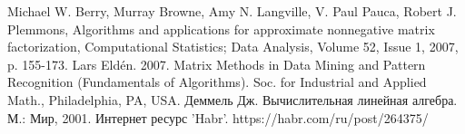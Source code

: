 \newpage
{}

\begin{thebibliography}{9}
   Michael W. Berry, Murray Browne, Amy N. Langville, V. Paul Pauca, Robert J. Plemmons, Algorithms and applications for approximate nonnegative matrix factorization, Computational Statistics; Data Analysis, Volume 52, Issue 1, 2007, p. 155-173.
   Lars Eldén. 2007. Matrix Methods in Data Mining and Pattern Recognition (Fundamentals of Algorithms). Soc. for Industrial and Applied Math., Philadelphia, PA, USA.
   Деммель Дж. Вычислительная линейная алгебра. М.: Мир, 2001.
   Интернет ресурс 'Habr'. https://habr.com/ru/post/264375/
\end{thebibliography}
